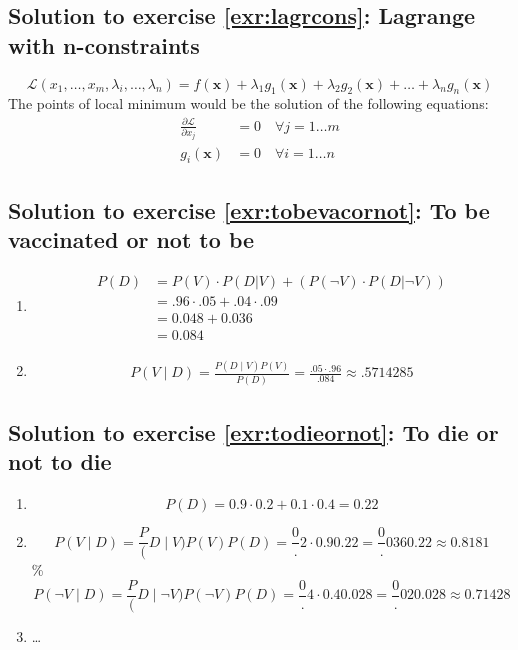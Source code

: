 \documentclass[
  12pt,
  oneside]{book}
\providecommand{\tightlist}{%
  \setlength{\itemsep}{0pt}\setlength{\parskip}{0pt}}
\theoremstyle{definition}
\theoremstyle{definition}
\theoremstyle{definition}
\theoremstyle{definition}
\theoremstyle{remark}
\begin{document}
\hypertarget{sol:lagrcons}{%
\subsection*{Solution to exercise \ref{exr:lagrcons}: Lagrange with n-constraints}\label{sol:lagrcons}}

\[
\mathcal{L}(x_1, \dots, x_m, \lambda_i, \dots, \lambda_n)=f(\mathbf{x})+\lambda_1 g_1(\mathbf{x})+\lambda_2 g_2(\mathbf{x})+\ldots+\lambda_n g_n(\mathbf{x})
\]
The points of local minimum would be the solution of the following equations:
\begin{align*}
    \frac{\partial \mathcal{L}}{\partial x_{j}} &=0 \quad \forall j=1 \dots m \\
    g_i(\mathbf{x}) &=0 \quad \forall i=1\dots n
\end{align*}

\hypertarget{sol:tobevacornot}{%
\subsection*{Solution to exercise \ref{exr:tobevacornot}: To be vaccinated or not to be}\label{sol:tobevacornot}}

\begin{enumerate}
\def\labelenumi{\alph{enumi})}
\tightlist
\item
  \begin{align*}
            P(D)&=P(V)\cdot P(D|V)+(P(\neg V)\cdot P(D|\neg V))\\
            &= .96\cdot .05 + .04 \cdot .09\\
            &= 0.048 + 0.036 \\&= 0.084
  \end{align*}
\item
  \begin{align*}
  P(V \mid D)={\frac {P(D\mid V)P(V)}{P(D)}}= \frac{.05\cdot .96}{.084}\approx .5714285
  \end{align*}
\end{enumerate}

\hypertarget{sol:todieornot}{%
\subsection*{Solution to exercise \ref{exr:todieornot}: To die or not to die}\label{sol:todieornot}}

\begin{enumerate}
\def\labelenumi{\alph{enumi})}
\tightlist
\item
  \[P(D) = 0.9\cdot0.2+0.1\cdot0.4=0.22\]
\item
  \[P(V\mid D)=\frac P(D\mid V)P(V)P(D)=\frac0.2\cdot 0.90.22=\frac0.0360.22\approx0.8181\]
  \% \[P(\neg V\mid D)=\frac P(D\mid \neg V)P(\neg V)P(D)=\frac0.4\cdot 0.40.028=\frac0.020.028\approx0.71428\]
\item
  \ldots{}
\end{enumerate}
\end{document}
